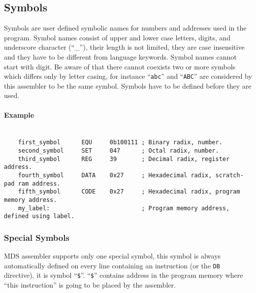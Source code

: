     \subsection{Symbols}
        Symbols are user defined symbolic names for numbers and addresses used in the program. Symbol names consist of upper and lower case letters, digits, and underscore character (``\_''), their length is not limited, they are case insensitive and they have to be different from language keywords. Symbol names cannot start with digit. Be aware of that there cannot coexists two or more symbols which differs only by letter casing, for instance ``\texttt{abc}'' and ``\texttt{ABC}'' are considered by this assembler to be the same symbol. Symbols have to be defined before they are used.

        \paragraph{Example}~\\
            \verb'    first_symbol      EQU     0b100111 ; Binary radix, number.'\\
            \verb'    second_symbol     SET     047      ; Octal radix, number.'\\
            \verb'    third_symbol      REG     39       ; Decimal radix, register address.'\\
            \verb'    fourth_symbol     DATA    0x27     ; Hexadecimal radix, scratch-pad ram address.'\\
            \verb'    fifth_symbol      CODE    0x27     ; Hexadecimal radix, program memory address.'\\
            \verb'    my_label:                          ; Program memory address, defined using label.'

        \subsubsection{Special Symbols}
            MDS assembler supports only one special symbol, this symbol is always automatically defined on every line containing an instruction (or the \texttt{DB} directive), it is symbol ``\texttt{\$}''. ``\texttt{\$}'' contains address in the program memory where ``this instruction'' is going to be placed by the assembler.

